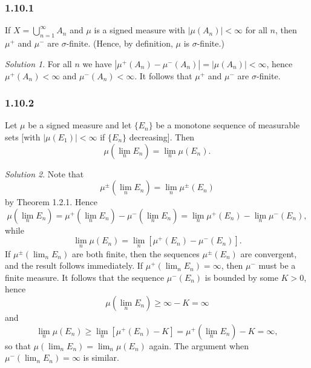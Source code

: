 \documentclass{report}
\theoremstyle{remark}
\newtheorem*{solution}{Solution}
\begin{document}
\subsubsection*{1.10.1}
If $X = \bigcup_{n=1}^\infty A_n$ and $\mu$ is a signed measure with $|\mu(A_n)| < \infty$ for all $n$, then $\mu^+$ and $\mu^-$ are $\sigma$-finite. (Hence, by definition, $\mu$ is $\sigma$-finite.)

\begin{solution}
  For all $n$ we have $|\mu^+(A_n) - \mu^-(A_n)| = |\mu(A_n)| < \infty$, hence $\mu^+(A_n) < \infty$ and $\mu^-(A_n) < \infty$. It follows that $\mu^+$ and $\mu^-$ are $\sigma$-finite.
\end{solution}

\subsubsection*{1.10.2}
Let $\mu$ be a signed measure and let $\{E_n\}$ be a monotone sequence of measurable sets [with $|\mu(E_1)| < \infty$ if $\{E_n\}$ decreasing]. Then
\begin{equation*}
  \mu \left( \lim_n E_n \right) = \lim_n \mu(E_n).
\end{equation*}

\begin{solution}
  Note that
  \begin{equation*}
    \mu^\pm \left( \lim_n E_n \right) = \lim_n \mu^\pm(E_n)
  \end{equation*}
  by Theorem 1.2.1. Hence
  \begin{equation*}
    \mu \left( \lim_n E_n \right) = \mu^+ \left( \lim_n E_n \right) - \mu^- \left( \lim_n E_n \right) = \lim_n \mu^+(E_n) - \lim_n \mu^-(E_n),
  \end{equation*}
  while
  \begin{equation*}
    \lim_n \mu(E_n) = \lim_n \left[ \mu^+(E_n) - \mu^-(E_n) \right].
  \end{equation*}
  If $\mu^\pm \left( \lim_n E_n \right)$ are both finite, then the sequences $\mu^\pm(E_n)$ are convergent, and the result follows immediately. If $\mu^+ \left( \lim_n E_n \right) = \infty$, then $\mu^-$ must be a finite measure. It follows that the sequence $\mu^-(E_n)$ is bounded by some $K > 0$, hence
  \begin{equation*}
    \mu \left( \lim_n E_n \right) \ge \infty - K = \infty
  \end{equation*}
  and
  \begin{equation*}
    \lim_n \mu(E_n) \ge \lim_n \left[ \mu^+(E_n) - K \right] = \mu^+ \left( \lim_n E_n \right) - K = \infty,
  \end{equation*}
  so that $\mu \left( \lim_n E_n \right) = \lim_n \mu(E_n)$ again. The argument when $\mu^- \left( \lim_n E_n \right) = \infty$ is similar.
\end{solution}
\end{document}
